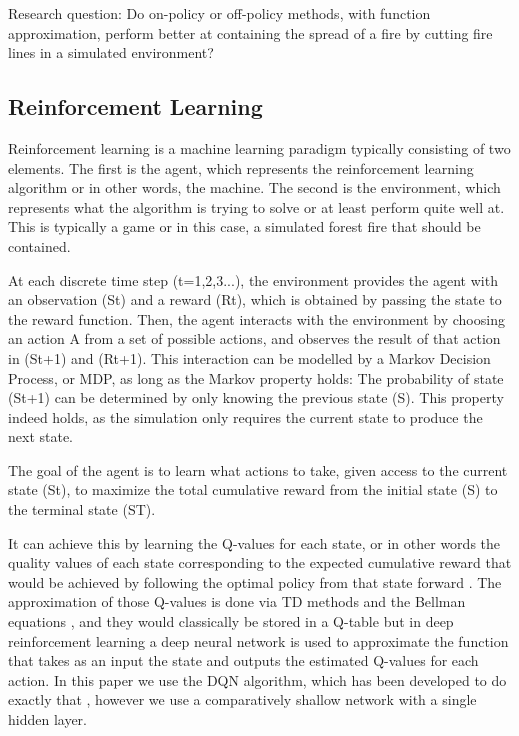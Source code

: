
Research question: Do on-policy or off-policy methods, with function approximation, perform better at containing the spread of a fire by cutting fire lines in a simulated environment?

\subsection{Reinforcement Learning}\label{sec:reinforcementlearning}
Reinforcement learning is a machine learning paradigm typically consisting of two elements. The first is the agent, which represents the reinforcement learning algorithm or in other words, the machine. The second is the environment, which represents what the algorithm is trying to solve or at least perform quite well at. This is typically a game or in this case, a simulated forest fire that should be contained.

At each discrete time step (t=1,2,3...), the environment provides the agent with an observation (St) and a reward (Rt), which is obtained by passing the state to the reward function. Then, the agent interacts with the environment by choosing an action A from a set of possible actions, and observes the result of that action in (St+1) and (Rt+1). This interaction can be modelled by a Markov Decision Process, or MDP, as long as the Markov property holds: The probability of state (St+1) can be determined by only knowing the previous state (S). This property indeed holds, as the simulation only requires the current state to produce the next state.

The goal of the agent is to learn what actions to take, given access to the current state (St), to maximize the total cumulative reward from the initial state (S) to the terminal state (ST).

It can achieve this by learning the Q-values for each state, or in other words the quality values of each state corresponding to the expected cumulative reward that would be achieved by following the optimal policy from that state forward \citep{sutton_barto_2018}. The approximation of those Q-values is done via TD methods and the Bellman equations \citep{sutton_barto_2018}, and they would classically be stored in a Q-table but in deep reinforcement learning a deep neural network is used to approximate the function that takes as an input the state and outputs the estimated Q-values for each action. In this paper we use the DQN algorithm, which has been developed to do exactly that \citep{mnih2015human}, however we use a comparatively shallow network with a single hidden layer.
